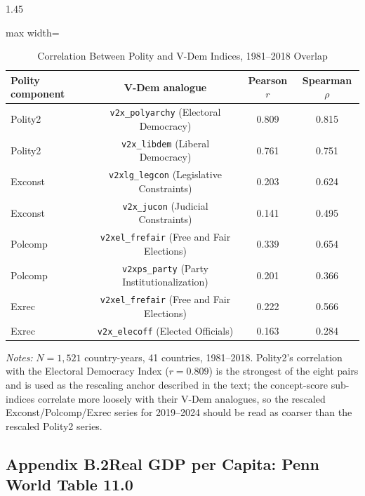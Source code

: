 \documentclass[12pt]{article}
\begin{document}
\begin{bibunit}[jpe]
\begin{spacing}{1.45}
\begin{table}[H]
\centering
\begin{adjustbox}{max width=\textwidth}
\begin{threeparttable}
\caption{Correlation Between Polity and V-Dem Indices, 1981--2018 Overlap}
\label{tab:B1}
\begin{tabular}{lccc}
\toprule
Polity component & V-Dem analogue & Pearson $r$ & Spearman $\rho$ \\
\midrule
Polity2  & \texttt{v2x\_polyarchy} (Electoral Democracy) & 0.809 & 0.815 \\
Polity2  & \texttt{v2x\_libdem} (Liberal Democracy)       & 0.761 & 0.751 \\
Exconst  & \texttt{v2xlg\_legcon} (Legislative Constraints) & 0.203 & 0.624 \\
Exconst  & \texttt{v2x\_jucon} (Judicial Constraints)      & 0.141 & 0.495 \\
Polcomp  & \texttt{v2xel\_frefair} (Free and Fair Elections) & 0.339 & 0.654 \\
Polcomp  & \texttt{v2xps\_party} (Party Institutionalization) & 0.201 & 0.366 \\
Exrec    & \texttt{v2xel\_frefair} (Free and Fair Elections) & 0.222 & 0.566 \\
Exrec    & \texttt{v2x\_elecoff} (Elected Officials)       & 0.163 & 0.284 \\
\bottomrule
\end{tabular}
\begin{tablenotes}[flushleft]
\footnotesize
\item \textit{Notes:} $N=1{,}521$ country-years, 41 countries, 1981--2018. Polity2's correlation with the Electoral Democracy Index ($r=0.809$) is the strongest of the eight pairs and is used as the rescaling anchor described in the text; the concept-score sub-indices correlate more loosely with their V-Dem analogues, so the rescaled Exconst/Polcomp/Exrec series for 2019--2024 should be read as coarser than the rescaled Polity2 series.
\end{tablenotes}
\end{threeparttable}
\end{adjustbox}
\end{table}

\subsection*{Appendix B.2\quad Real GDP per Capita: Penn World Table 11.0}


\end{spacing}
\end{bibunit}
\end{document}
